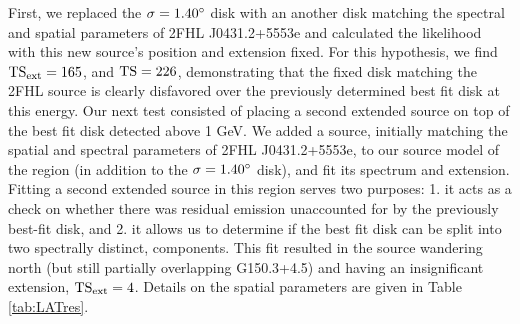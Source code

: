 \documentclass[iop]{emulateapj}
\newcommand{\Gone}{G150.3+4.5}
\newcommand{\ghard}{2FHL J0431.2+5553e}
\begin{document}
First, we  replaced the ${\rm \sigma = 1.40^{\circ}}$ disk with an another disk matching the spectral and spatial parameters of \ghard{} and calculated the likelihood with this new source's position and extension fixed. For this hypothesis, we find ${\rm TS_{ext} =  165}$, and  ${\rm TS = 226}$, demonstrating that the fixed disk matching the 2FHL source is clearly disfavored over the previously determined best fit disk at this energy. Our next test consisted of placing a second extended source on top of the best fit disk detected above 1 GeV. We added a source, initially matching the spatial and spectral parameters of \ghard{}, to our source model of the region (in addition to the ${\rm \sigma = 1.40^{\circ}}$ disk), and fit its spectrum and extension. Fitting a second extended source in this region serves two purposes: 1. it acts as a check on whether there was residual emission unaccounted for by the previously best-fit disk, and 2. it allows us to determine if the best fit disk can be split into two spectrally distinct, components. This fit resulted in the source wandering north (but still partially overlapping \Gone{}) and having an insignificant extension, ${\rm TS_{ext} =  4}$. Details on the spatial parameters are given in Table \ref{tab:LATres}.



\end{document}
